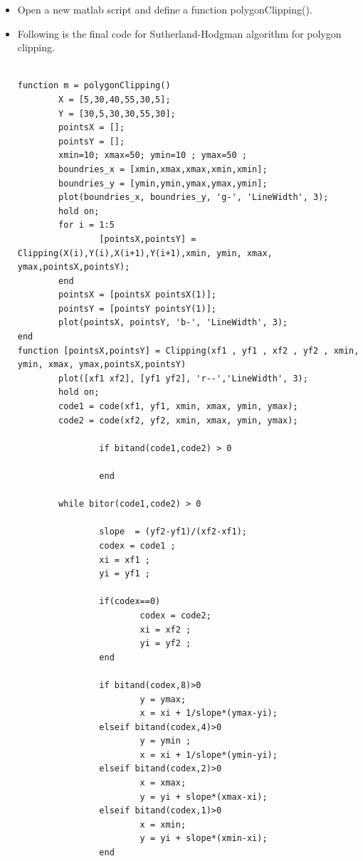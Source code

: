 \begin{itemize}

\item Open a new matlab script and define a function polygonClipping().
\item Following is the final code for Sutherland-Hodgman algorithm for polygon clipping.
\begin{lstlisting}

function m = polygonClipping()
        X = [5,30,40,55,30,5];
        Y = [30,5,30,30,55,30];
        pointsX = [];
        pointsY = [];
        xmin=10; xmax=50; ymin=10 ; ymax=50 ;
        boundries_x = [xmin,xmax,xmax,xmin,xmin];
        boundries_y = [ymin,ymin,ymax,ymax,ymin];
        plot(boundries_x, boundries_y, 'g-', 'LineWidth', 3);
        hold on;
        for i = 1:5
                [pointsX,pointsY] = Clipping(X(i),Y(i),X(i+1),Y(i+1),xmin, ymin, xmax, ymax,pointsX,pointsY);
        end
        pointsX = [pointsX pointsX(1)];
        pointsY = [pointsY pointsY(1)];
        plot(pointsX, pointsY, 'b-', 'LineWidth', 3);
end
function [pointsX,pointsY] = Clipping(xf1 , yf1 , xf2 , yf2 , xmin, ymin, xmax, ymax,pointsX,pointsY)
        plot([xf1 xf2], [yf1 yf2], 'r--','LineWidth', 3);
        hold on;
        code1 = code(xf1, yf1, xmin, xmax, ymin, ymax);
        code2 = code(xf2, yf2, xmin, xmax, ymin, ymax);

                if bitand(code1,code2) > 0

                end

        while bitor(code1,code2) > 0

                slope  = (yf2-yf1)/(xf2-xf1);
                codex = code1 ;
                xi = xf1 ;
                yi = yf1 ;

                if(codex==0)
                        codex = code2;
                        xi = xf2 ;
                        yi = yf2 ;
                end

                if bitand(codex,8)>0
                        y = ymax;
                        x = xi + 1/slope*(ymax-yi);
                elseif bitand(codex,4)>0
                        y = ymin ;
                        x = xi + 1/slope*(ymin-yi);
                elseif bitand(codex,2)>0
                        x = xmax;
                        y = yi + slope*(xmax-xi);
                elseif bitand(codex,1)>0
                        x = xmin;
                        y = yi + slope*(xmin-xi);
                end


\end{lstlisting}
\end{itemize}
